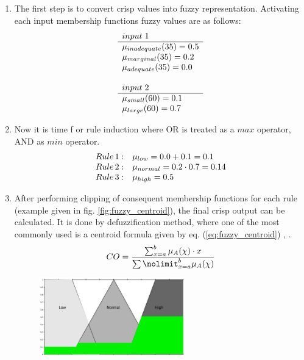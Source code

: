\begin{enumerate}
    \item The first step is to convert crisp values into fuzzy representation.
        Activating each input membership functions fuzzy values are as follows:
        $$
            \begin{array}[H]{l}
                input \;1 \\ \hline
                \mu_{inadequate}(35) = 0.5 \\
                \mu_{marginal}(35) = 0.2 \\
                \mu_{adequate}(35) = 0.0 \\ \\
                input \;2 \\ \hline
                \mu_{small}(60) = 0.1 \\
                \mu_{large}(60) = 0.7 \\ 
            \end{array}
        $$
    \item Now it is time f or rule induction where OR is treated as a $max$ operator, AND
        as $min$ operator. 
        $$
            \begin{array}[H]{ll}
                Rule \,1: & \mu_{low} = 0.0 + 0.1 = 0.1 \\
                Rule \,2: & \mu_{normal} = 0.2\cdot 0.7 = 0.14 \\
                Rule \,3: & \mu_{high} = 0.5 \\
            \end{array}
        $$
    \item After performing clipping of consequent membership functions for each
        rule (example given in fig. \ref{fig:fuzzy_centroid}), the final crisp output can be calculated. It is done by
        defuzzification method, where one of the most commonly used is a centroid
        formula given by eq. (\ref{eq:fuzzy_centroid}) \cite{bib0}, \cite{bib1}.
        \begin{equation}
            CO = \frac{\sum\nolimits_{x=a}^{b}\mu_A(\chi)\cdot
            x}{\sum\nolimit_{x=a}^{b}\mu_A(\chi)}
            \label{eq:fuzzy_centroid}
        \end{equation}
        \begin{figure}[H]
            \begin{center}
                \includegraphics[width=0.6\textwidth, height=0.4\textwidth]{fig/fuzzy_centroid.png}

\end{center}
\end{figure}
\end{enumerate}
